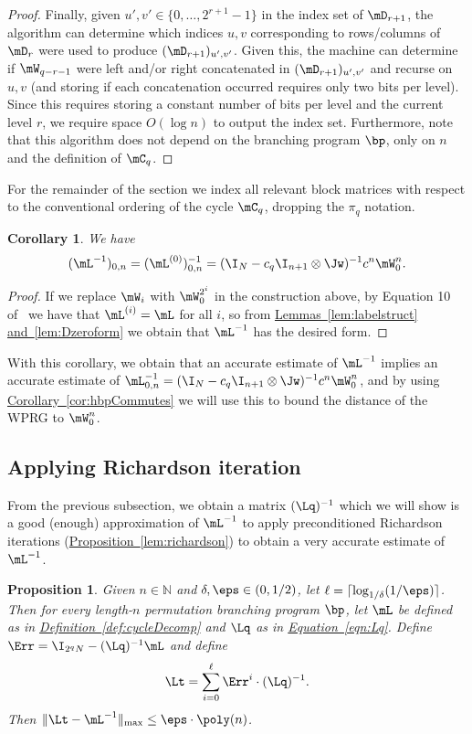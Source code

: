 \documentclass[11pt]{article}
\newcommand{\expref}[2]{\texorpdfstring{\hyperref[#2]{#1~\ref{#2}}}{#1~\ref{#2}}}
\newcommand{\expeqref}[2]{\texorpdfstring{\hyperref[#2]{#1~\eqref{#2}}}{#1~\eqref{#2}}}
\newtheorem{corollary}[theorem]{Corollary}
\newtheorem{proposition}[theorem]{Proposition}
\newcommand{\N}{{\mathbb N}}
\begin{document}
\begin{proof}
Finally, given $u',v' \in \{0,\ldots,2^{r+1}-1\}$ in the index set of $\mD_{r+1}$, the algorithm can determine which indices $u,v$ corresponding to rows/columns of $\mD_{r}$ were used to produce $(\mD_{r+1})_{u',v'}$. Given this, the machine can determine if $\mW_{q-r-1}$ were left and/or right concatenated in $(\mD_{r+1})_{u',v'}$ and recurse on $u,v$ (and storing if each concatenation occurred requires only two bits per level). Since this requires storing a constant number of bits per level and the current level $r$, we require space $O(\log n)$ to output the index set. Furthermore, note that this algorithm does not depend on the branching program $\bp$, only on $n$ and the definition of $\mC_q$.
\end{proof}
For the remainder of the section we index all relevant block matrices with respect to the conventional ordering of the cycle $\mC_q$, dropping the $\pi_q$ notation.  
\begin{corollary}\label{cor:trueCycleInverse}
We have
$$(\mL^{-1})_{0,n}=(\mL^{(0)})^{-1}_{0,n} = (\I_N-c_q\I_{n+1}\otimes\Jw)^{-1}c^n\mW_0^n.$$
\end{corollary}
\begin{proof}
  If we replace $\mW_i$ with $\mW_0^{2^i}$ in the construction above, by Equation 10 of~\cite{AhmadinejadKeMuPeSiVa19} we have that $\mL^{(i)}=\mL$ for all $i$, so from
%
\expref{Lemmas}{lem:labelstruct} \expref{and}{lem:Dzeroform} %
we obtain that $\mL^{-1}$ has the desired form.
\end{proof}
With this corollary, we obtain that an accurate estimate of $\mL^{-1}$ implies an accurate estimate of $\mL^{-1}_{0,n}=(\I_N-c_q\I_{n+1}\otimes\Jw)^{-1}c^n\mW_0^n$, and by using \expref{Corollary}{cor:hbpCommutes} we will use this to bound the distance of the WPRG to $\mW_0^n$.

\subsection{Applying Richardson iteration}
From the previous subsection, we obtain a matrix $(\Lq)^{-1}$ which we will show is a good (enough) approximation of $\mL^{-1}$ to apply preconditioned Richardson iterations (\expref{Proposition}{lem:richardson}) to obtain a very accurate estimate of $\mL^{-1}$.

\begin{proposition}\label{prop:cycleEntrywise}
Given $n\in \N$ and $\delta,\eps \in (0,1/2)$, let $\ell=\lceil \log_{1/\delta}(1/\eps)\rceil$. Then for every length-$n$ permutation branching program $\bp$, let $\mL$ be defined as in \expref{Definition}{def:cycleDecomp} and $\Lq$ as in \expeqref{Equation}{eqn:Lq}. Define $\Err = \I_{2^qN}-(\Lq)^{-1}\mL$ and define
$$\Lt=\sum_{i=0}^\ell \Err^i\cdot (\Lq)^{-1}.$$
Then $\|\Lt - \mL^{-1}\|_{\max}\leq \eps \cdot \poly(n)$.
\end{proposition}
\end{document}
